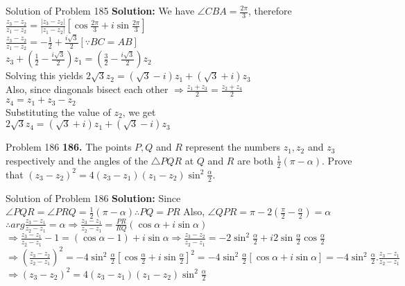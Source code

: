\documentclass[aspectratio=169,8pt]{beamer}
\begin{document}
\begin{frame}{Solution of Problem 185}
  \textbf{Solution:} We have $\angle CBA =\frac{2\pi}{3}$, therefore\\
  \vspace*{0.2cm}
  $\frac{z_3 - z_2}{z_1 - z_2} = \frac{|z_3 - z_2|}{|z_1 - z_2|}\left[\cos\frac{2\pi}{3} + i\sin\frac{2\pi}{3}\right]$\\
  \vspace*{0.2cm}
  $\frac{z_3 - z_2}{z_1 - z_2} = -\frac{1}{2} + \frac{i\sqrt{3}}{2}[\because BC = AB]$\\
  \vspace*{0.2cm}
  $z_3 + \left(\frac{1}{2} - \frac{i\sqrt{3}}{2}\right)z_1 = \left(\frac{3}{2} - \frac{i\sqrt{3}}{2}\right)z_2$\\
  \vspace*{0.2cm}
  Solving this yields $2\sqrt{3}z_2 = (\sqrt{3} - i)z_1 + (\sqrt{3} + i)z_3$\\
  \vspace*{0.2cm}
  Also, since diagonals bisect each other $\Rightarrow \frac{z_1 + z_3}{2} = \frac{z_2 + z_4}{2}$\\
  \vspace*{0.2cm}
  $z_4 = z_1 + z_3 - z_2$\\
  \vspace*{0.2cm}
  Substituting the value of $z_2$, we get\\
  \vspace*{0.2cm}
  $2\sqrt{3}z_4 = (\sqrt{3} + i)z_1 + (\sqrt{3} - i)z_3$
\end{frame}
\begin{frame}{Problem 186}
  \textbf{186.} The points $P, Q$ and $R$ represent the numbers $z_1, z_2$ and $z_3$ respectively and the angles of the $\triangle
  PQR$ at $Q$ and $R$ are both $\frac{1}{2}(\pi - \alpha)$. Prove that $(z_3 - z_2)^2 = 4(z_3 - z_1)(z_1 -
  z_2)\sin^2\frac{\alpha}{2}$.
\end{frame}
\begin{frame}{Solution of Problem 186}
  \textbf{Solution:} Since $\angle PQR = \angle PRQ = \frac{1}{2}(\pi - \alpha) \therefore PQ = PR$ Also, $\angle QPR = \pi -
  2\left(\frac{\pi}{2} - \frac{\alpha}{2}\right) = \alpha$\\
  \vspace*{0.2cm}
  $\therefore arg\frac{z_3 - z_1}{z_2 - z_1} = \alpha \Rightarrow \frac{z_3 - z_1}{z_2 - z_1} = \frac{PR}{RQ}(\cos\alpha +
  i\sin\alpha)$\\
  \vspace*{0.2cm}
  $\Rightarrow \frac{z_3 - z_1}{z_2 - z_1} -1 = (\cos\alpha - 1) + i\sin\alpha \Rightarrow \frac{z_3 - z_2}{z_2 - z_1} =
  -2\sin^2\frac{\alpha}{2} + i2\sin\frac{\alpha}{2}\cos\frac{\alpha}{2}$\\
  \vspace*{0.2cm}
  $\Rightarrow \left(\frac{z_3 - z_2}{z_2 - z_1}\right)^2 = -4\sin^2\frac{\alpha}{2}\left[\cos\frac{\alpha}{2} +
    i\sin\frac{\alpha}{2}\right]^2 = -4\sin^2\frac{\alpha}{2}[\cos\alpha + i\sin\alpha] = -4\sin^2\frac{\alpha}{2}.\frac{z_3 -
    z_1}{z_2 - z_1}$\\
  \vspace*{0.2cm}
  $\Rightarrow (z_3 - z_2)^2 = 4(z_3 - z_1)(z_1 - z_2)\sin^2\frac{\alpha}{2}$
\end{frame}
\end{document}
